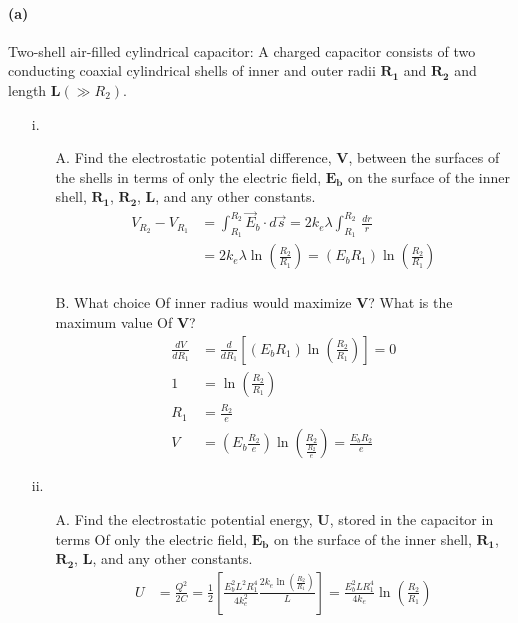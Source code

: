 \documentclass[]{article}
\begin{document}
{		\paragraph{(a)} Two-shell air-filled cylindrical capacitor: A charged capacitor consists of two conducting coaxial cylindrical shells of inner and outer radii $\bm{R_1}$ and $\bm{R_2}$ and length $\bm{L} \left( \gg R_2 \right) $.
			\begin{enumerate}
				\item[i.] 
				\begin{enumerate}
					\item[A.] Find the electrostatic potential difference, $\bm{V}$, between the surfaces of the shells in terms of only the electric field, $\bm{E_b}$ on the surface of the inner shell, $\bm{R_1}$, $\bm{R_2}$, $\bm{L}$, and any other constants.
						\begin{equation*}
							\begin{split}
								V_{R_2} - V_{R_1} &= \int_{R_1}^{R_2} \vec{E}_b \cdot d\vec{s} = 2k_e \lambda \int_{R_1}^{R_2} \, \frac{dr}{r} \\
								&=  2k_e \lambda \ln \left( \frac{R_2}{R_1} \right) = (E_b R_1) \ln \left( \frac{R_2}{R_1} \right)  \\
							\end{split}
						\end{equation*}
					
					\item[B.] What choice Of inner radius would maximize $\bm{V}$? What is the maximum value Of $\bm{V}$? \\
						\begin{equation*}
							\begin{split}
								\frac{dV}{dR_1} &= \frac{d}{dR_1} \left[ (E_b R_1) \ln \left( \frac{R_2}{R_1} \right) \right] = 0 \\
								1 &= \ln\left( \frac{R_2}{R_1} \right) \\
								R_1 &= \frac{R_2}{e} \\
								V &= (E_b \frac{R_2}{e}) \ln \left( \frac{R_2}{\frac{R_2}{e}} \right) = \frac{E_bR_2}{e}
							\end{split}
						\end{equation*}
	
				\end{enumerate}
				\item[ii.]
				\begin{enumerate}
					\item[A.] Find the electrostatic potential energy, $\bm{U}$, stored in the capacitor in terms Of only the electric field, $\bm{E_b}$ on the surface of the inner shell, $\bm{R_1}$, $\bm{R_2}$, $\bm{L}$, and any other constants.
						\begin{equation*}
							\begin{split}
								U &= \frac{Q^2}{2C} = \frac{1}{2} \left[ \frac{E_b^2 L^2 R_1^4}{4k_e^2} \frac{2k_e \ln(\frac{R_2}{R_1})}{L} \right] = \frac{E_b^2 L R_1^4}{4k_e} \ln(\frac{R_2}{R_1}) \\
							\end{split}
						\end{equation*}
					

\end{enumerate}
\end{enumerate}}
\end{document}
